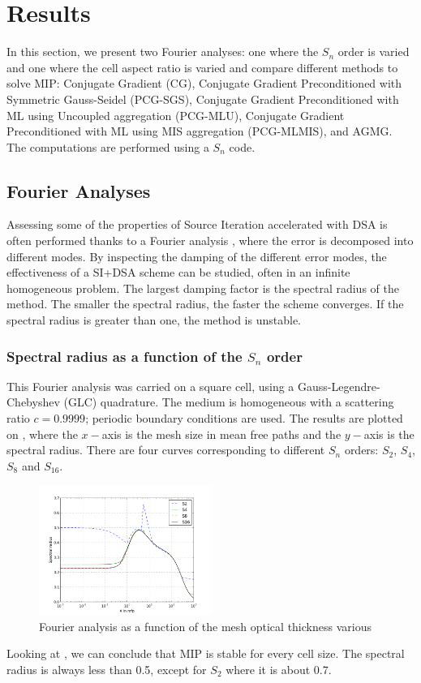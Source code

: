 \section{Results} \label{sec_res}
In this section, we present two Fourier analyses: one where the $S_n$ order is
varied and one where the cell aspect ratio is varied and compare different
methods to solve MIP: Conjugate Gradient (CG), Conjugate Gradient
Preconditioned with Symmetric Gauss-Seidel (PCG-SGS), Conjugate Gradient
Preconditioned with ML using Uncoupled aggregation (PCG-MLU),
Conjugate Gradient Preconditioned with ML using MIS aggregation (PCG-MLMIS),
and AGMG. The computations are performed using a $S_n$ code.
\subsection{Fourier Analyses}
Assessing some of the properties of Source Iteration accelerated with DSA is
often performed thanks to a Fourier analysis \cite{larsen_dsa,consistent_p1},
where the error is decomposed into different modes. By inspecting the 
damping of the different error modes, the effectiveness of a SI+DSA scheme can 
be studied, often in an infinite homogeneous problem. The largest damping
factor is the spectral radius of the method. The smaller the spectral radius,
the faster the scheme converges. If the spectral
radius is greater than one, the method is unstable. 
\subsubsection{Spectral radius as a function of the $S_n$ order}
This Fourier analysis was carried on a square cell, using a
Gauss-Legendre-Chebyshev (GLC) quadrature. The medium is homogeneous with a 
scattering ratio $c=0.9999$; periodic boundary conditions are used. The results 
are plotted on , where the $x-$axis is the mesh size in mean free 
paths and the $y-$axis is the spectral radius. There are four curves corresponding 
to different $S_n$ orders: $S_2$, $S_4$, $S_8$ and $S_{16}$.
\begin{figure}[H]
  \centering
  \includegraphics[width=0.5\textwidth]{sn_order_9999}
  \caption{Fourier analysis as a function of the mesh optical thickness
    various}
  \label{fig_fa_sn}
\end{figure}
Looking at , we can conclude that MIP is stable for every 
cell size. The spectral radius is always less than 0.5, except for $S_2$ where 
it is about 0.7.

